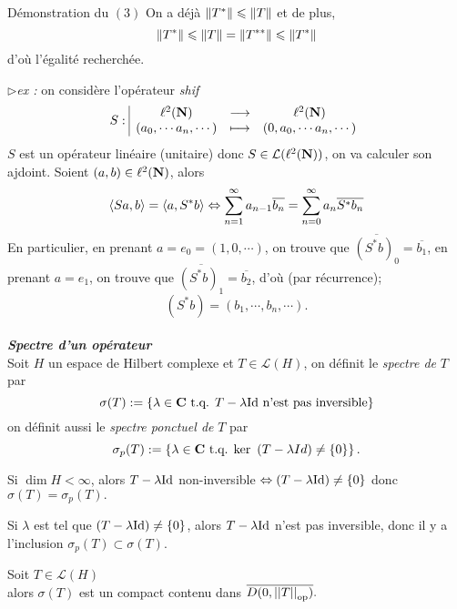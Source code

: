 \documentclass[a4paper,11pt, twoside]{article}
\begin{document}
\begin{ProofC}{Démonstration du $(\mathit 3)$}
  On a déjà $\left\lVert T^*\right\rVert\leqslant \left\lVert T\right\rVert$ et de plus, 
  $$\left\lVert T^*\right\rVert\leqslant \left\lVert T\right\rVert=\left\lVert T^{**}\right\rVert\leqslant \left\lVert T^*\right\rVert$$ 
  d'où l'égalité recherchée.  
\end{ProofC}


$\triangleright$\emph{ex :} on considère l'opérateur \emph{shif}
$$S:\begin{array}{|ccc}
  \ell^2(\mathbf N)&\longrightarrow&\ell^2(\mathbf N)\\
  (a_0,\cdots a_n,\cdots)&\longmapsto&(0,a_0,\cdots a_n,\cdots)
\end{array}$$
$S$ est un opérateur linéaire (unitaire) donc $S\in\mathcal L(\ell^2(\mathbf N))$, on va calculer son ajdoint. Soient $(a,b)\in\ell^2(\mathbf N)$, alors 
$$\left\langle Sa,b \right\rangle=\left\langle a,S^*b \right\rangle\Leftrightarrow\sum_{n=1}^\infty a_{n-1}\overline{b_n}=\sum_{n=0}^\infty a_{n}\overline{S^*b_n}$$
En particulier, en prenant $a=e_0=(1,0,\cdots)$, on trouve que $\overline{(S^*b)_0}=\overline{b_1}$, en prenant $a=e_1$, on trouve que $\overline{(S^*b)_1}=\overline{b_2}$, d'où (par récurrence);
$$(S^*b)=(b_1,\cdots,b_n,\cdots).$$\\



{\bf{\emph{Spectre d'un opérateur}}}\\[2em]



Soit $H$ un espace de Hilbert complexe et $T\in\mathcal L(H)$, on définit le \emph{spectre de }$T$ par 
$$\sigma(T):=\left\{\lambda\in \mathbf C\text{ t.q. } T-\lambda \mathrm{Id}\text{ n'est pas inversible}\right\}$$
on définit aussi le \emph{spectre ponctuel de }$T$ par 
$$\sigma_p(T):=\left\{\lambda\in \mathbf C\text{ t.q. } \mathrm{ker}\ \left(T-\lambda \\Id\right)\neq \left\{0\right\}\right\}.$$



\begin{RQ}
  Si $\dim H<\infty$, alors $T-\lambda \mathrm{Id}$ non-inversible $\Leftrightarrow \left(T-\lambda \mathrm{Id}\right)\neq \left\{0\right\}$ donc $\sigma(T)=\sigma_p(T).$\\
\end{RQ}


\begin{RQ}
  Si $\lambda$ est tel que $\left(T-\lambda \mathrm{Id}\right)\neq \left\{0\right\}$, alors $T-\lambda \mathrm{Id}$ n'est pas inversible, donc il y a l'inclusion $\sigma_p(T)\subset \sigma(T).$\\
\end{RQ}


\begin{prop}
  Soit $T\in\mathcal L(H)$\\

  alors $\sigma(T)$ est un compact contenu dans $\overline{D(0,\left|\left|T\right|\right|_{\mathrm{op}})}.$
\end{prop}
\end{document}
